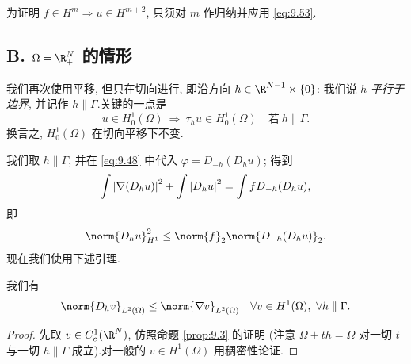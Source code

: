 为证明 $f\in H^m\Rightarrow u\in H^{m+2}$, 只须对 $m$ 作归纳并应用
\eqref{eq:9.53}.

\subsection*{B. $\Omega=\R^N_+$ 的情形}

我们再次使用平移, 但只在切向进行, 即沿方向
$h\in\R^{N-1}\times\{0\}$: 我们说 $h$ \emph{平行于边界}, 并记作
$h\parallel\Gamma$.关键的一点是
\begin{equation*}
u\in H_0^1(\Omega)\ \Rightarrow\ \tau_hu\in H_0^1(\Omega)
\quad\text{若}\ h\parallel\Gamma.
\end{equation*}
换言之, $H_0^1(\Omega)$ 在切向平移下不变.

我们取 $h\parallel\Gamma$, 并在 \eqref{eq:9.48} 中代入
$\varphi=D_{-h}(D_hu)$; 得到
\begin{equation*}
\int\left|\nabla(D_hu)\right|^2+\int\left|D_hu\right|^2=\int fD_{-h}(D_hu),
\end{equation*}
即
\begin{equation}
\norm{D_hu}_{H^1}^2\le\norm{f}_2\norm{D_{-h}(D_hu)}_2.
\label{eq:9.54}
\end{equation}
现在我们使用下述引理.

\begin{lemma}
\label{lem:9.6}
我们有
\begin{equation*}
\norm{D_hv}_{L^2(\Omega)}\le\norm{\nabla v}_{L^2(\Omega)}
\quad\forall v\in H^1(\Omega),\ \forall h\parallel\Gamma.
\end{equation*}
\end{lemma}

\begin{proof}
先取 $v\in C_c^1(\R^N)$, 仿照命题  \ref{prop:9.3} 的证明 (注意
$\Omega+th=\Omega$ 对一切 $t$ 与一切 $h\parallel\Gamma$ 成立).对一般的
$v\in H^1(\Omega)$ 用稠密性论证.
\end{proof}

